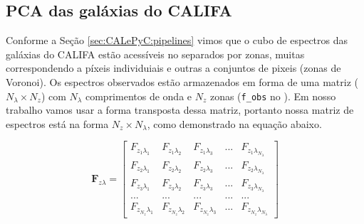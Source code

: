 \subsection{PCA das galáxias do CALIFA}

Conforme a Seção \ref{sec:CALePyC:pipelines} vimos que o cubo de espectros das galáxias do CALIFA estão acessíveis no
\pycasso separados por zonas, muitas correspondendo a píxeis individuiais e outras a conjuntos de pixeis (zonas de
Voronoi). Os espectros observados estão armazenados em forma de uma matriz ($N_\lambda \times N_z$) com $N_\lambda$
comprimentos de onda e $N_z$ zonas (\texttt{f\_obs} no \pycasso). Em nosso trabalho vamos usar a forma transposta dessa
matriz, portanto nossa matriz de espectros está na forma $N_z \times N_\lambda$, como demonstrado na equação abaixo.

\begin{equation}
    \label{eq:PCA:fluxMatrix}
    \mathbf{F}{}_{z \lambda} = \left[
    \begin{array}{ccccc}
        F_{z_1 \lambda_1} & F_{z_1 \lambda_2} & F_{z_1 \lambda_3} & ... & F_{z_1 \lambda_{N_\lambda}} \\
        F_{z_2 \lambda_1} & F_{z_2 \lambda_2} & F_{z_2 \lambda_3} & ... & F_{z_2 \lambda_{N_\lambda}} \\
        F_{z_3 \lambda_1} & F_{z_3 \lambda_2} & F_{z_3 \lambda_3} & ... & F_{z_3 \lambda_{N_\lambda}} \\
        ...               & ...               & ...               & ... & ...               \\
        F_{z_{N_z} \lambda_1} & F_{z_{N_z} \lambda_2} & F_{z_{N_z} \lambda_3} & ... & F_{z_{N_z}
        \lambda_{N_\lambda}}
    \end{array} 
    \right]
\end{equation}

